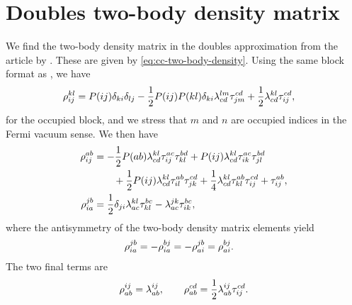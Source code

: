     \section{Doubles two-body density matrix}
        \label{app:ccd-two-body-density-matrix}
        We find the two-body density matrix in the doubles approximation from
        the article by \citeauthor{kvaal2012ab} \cite{kvaal2012ab}.
        These are given by \autoref{eq:cc-two-body-density}.
        Using the same block format as \citeauthor{kvaal2012ab}
        \cite{kvaal2012ab}, we have
        \begin{align}
            \rho^{kl}_{ij}
            &=
            P(ij) \delta_{ki} \delta_{lj}
            - \frac{1}{2} P(ij) P(kl)
            \delta_{ki} \lambda^{lm}_{cd} \tau^{cd}_{jm}
            + \frac{1}{2} \lambda^{kl}_{cd} \tau^{cd}_{ij},
        \end{align}
        for the occupied block, and we stress that $m$ and $n$ are occupied
        indices in the Fermi vacuum sense.
        We then have
        \begin{align}
            \rho^{ab}_{ij}
            &= -\frac{1}{2} P(ab) \lambda^{kl}_{cd} \tau^{ac}_{ij}
            \tau^{bd}_{kl}
            + P(ij) \lambda^{kl}_{cd}\tau^{ac}_{ik}
            \tau^{bd}_{jl}
            \nonumber \\
            &\qquad
            + \frac{1}{2} P(ij) \lambda^{kl}_{cd}
            \tau^{ab}_{il} \tau^{cd}_{jk}
            + \frac{1}{4} \lambda^{kl}_{cd} \tau^{ab}_{kl}
            \tau^{cd}_{ij}
            + \tau^{ab}_{ij}, \\
            \rho^{jb}_{ia}
            &=
            \frac{1}{2} \delta_{ji} \lambda^{kl}_{ac}
            \tau^{bc}_{kl}
            - \lambda^{jk}_{ac} \tau^{bc}_{ik},
        \end{align}
        where the antisymmetry of the two-body density matrix elements yield
        \begin{align}
            \rho^{jb}_{ia}
            &=
            -\rho^{bj}_{ia}
            =
            -\rho^{jb}_{ai}
            =
            \rho^{bj}_{ai}.
        \end{align}
        The two final terms are
        \begin{gather}
            \rho^{ij}_{ab}
            = \lambda^{ij}_{ab},
            \qquad
            \rho^{cd}_{ab}
            = \frac{1}{2} \lambda^{ij}_{ab}
            \tau^{cd}_{ij}.
        \end{gather}


